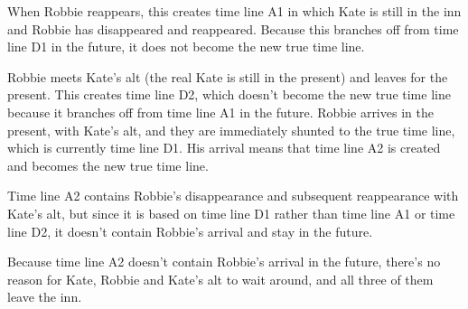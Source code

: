 \begin{multicols*}{2}
When Robbie reappears, this creates time line A1 in which Kate is still in the inn and Robbie has disappeared and reappeared. Because this branches off from time line D1 in the future, it does not become the new true time line.

Robbie meets Kate’s alt (the real Kate is still in the present) and leaves for the present. This creates time line D2, which doesn’t become the new true time line because it branches off from time line A1 in the future. Robbie arrives in the present, with Kate’s alt, and they are immediately shunted to the true time line, which is currently time line D1. His arrival means that time line A2 is created and becomes the new true time line.

Time line A2 contains Robbie’s disappearance and subsequent reappearance with Kate’s alt, but since it is based on time line D1 rather than time line A1 or time line D2, it doesn’t contain Robbie’s arrival and stay in the future.

Because time line A2 doesn’t contain Robbie’s arrival in the future, there’s no reason for Kate, Robbie and Kate’s alt to wait around, and all three of them leave the inn.

\end{multicols*}
